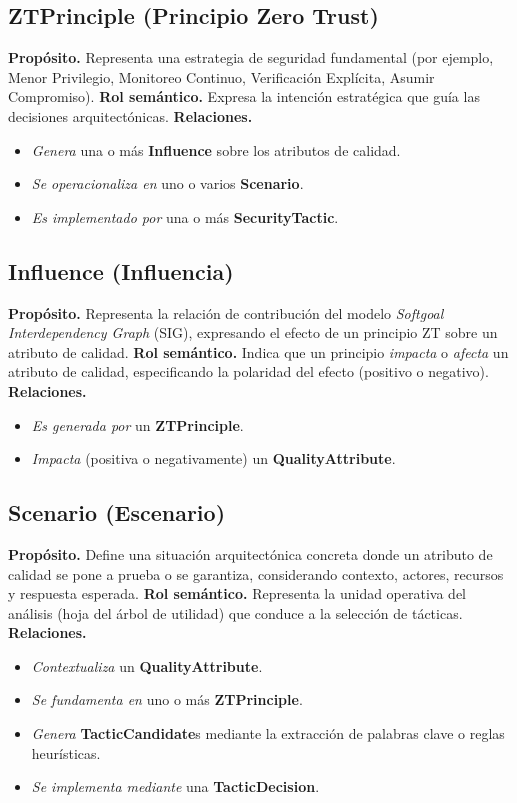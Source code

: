 \documentclass[12pt,letterpaper]{article}
\begin{document}
	\subsection{ZTPrinciple (Principio Zero Trust)}
	\textbf{Propósito.} Representa una estrategia de seguridad fundamental (por ejemplo, Menor Privilegio, Monitoreo Continuo, Verificación Explícita, Asumir Compromiso).  
	\textbf{Rol semántico.} Expresa la intención estratégica que guía las decisiones arquitectónicas.  
	\textbf{Relaciones.}
	\begin{itemize}[noitemsep]
		\item \emph{Genera} una o más \textbf{Influence} sobre los atributos de calidad.
		\item \emph{Se operacionaliza en} uno o varios \textbf{Scenario}.
		\item \emph{Es implementado por} una o más \textbf{SecurityTactic}.
	\end{itemize}
	
	\subsection{Influence (Influencia)}
	\textbf{Propósito.} Representa la relación de contribución del modelo \textit{Softgoal Interdependency Graph} (SIG), expresando el efecto de un principio ZT sobre un atributo de calidad.  
	\textbf{Rol semántico.} Indica que un principio \emph{impacta} o \emph{afecta} un atributo de calidad, especificando la polaridad del efecto (positivo o negativo).  
	\textbf{Relaciones.}
	\begin{itemize}[noitemsep]
		\item \emph{Es generada por} un \textbf{ZTPrinciple}.
		\item \emph{Impacta} (positiva o negativamente) un \textbf{QualityAttribute}.
	\end{itemize}
	
	\subsection{Scenario (Escenario)}
	\textbf{Propósito.} Define una situación arquitectónica concreta donde un atributo de calidad se pone a prueba o se garantiza, considerando contexto, actores, recursos y respuesta esperada.  
	\textbf{Rol semántico.} Representa la unidad operativa del análisis (hoja del árbol de utilidad) que conduce a la selección de tácticas.  
	\textbf{Relaciones.}
	\begin{itemize}[noitemsep]
		\item \emph{Contextualiza} un \textbf{QualityAttribute}.
		\item \emph{Se fundamenta en} uno o más \textbf{ZTPrinciple}.
		\item \emph{Genera} \textbf{TacticCandidate}s mediante la extracción de palabras clave o reglas heurísticas.
		\item \emph{Se implementa mediante} una \textbf{TacticDecision}.
	\end{itemize}
	
\end{document}
